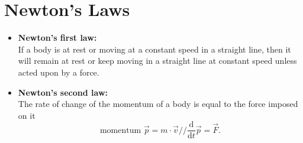 
\setcounter{chapter}{5}
\chapter{Newton's Laws}

\begin{definition}
\newline

	\begin{itemize}
		\item \textbf{Newton's first law:} \\
			If a body is at rest or moving at a constant speed in a straight line, then it will remain at rest or keep moving in a straight line at constant speed unless acted upon by a force.
	\item \textbf{Newton's second law:}\\
		The rate of change of the momentum of a body is equal to the force imposed on it
		\[
			\text{momentum } \vec{p} = m \cdot \vec{v}//	
			\frac{\mathrm{d} }{\mathrm{d} t} \vec{p} = \vec{F}
		.\] 
	\end{itemize}	
\end{definition}
